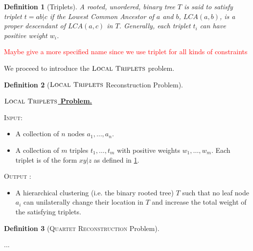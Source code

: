 \documentclass{article}
\theoremstyle{definition}  %
\theoremstyle{plain}
\newtheorem{definition}{Definition}
\numberwithin{observation}{section}
\numberwithin{claim}{section}
\numberwithin{fact}{section}
\numberwithin{lemma}{section}
\numberwithin{proposition}{section}
\numberwithin{theorem}{section}
\numberwithin{corollary}{section}
\numberwithin{definition}{section}
\newenvironment{nproblem}[1][\unskip]{%
  \medskip
  \begin{mdframed}
  \noindent
  \textbf{\underline{$#1$ Problem.}} \\
  \noindent
}{%
  \end{mdframed}
  \medskip %
}
\newcommand{\Triplets}{\textsc{Local Triplets}}
\theoremstyle{plain}
\begin{document}
\begin{definition}[Triplets] \label{def:triplets}
    A rooted, unordered, binary tree $T$ is said to satisfy triplet $t = ab|c$ if the Lowest Common Ancestor of $a$ and $b$, $LCA(a, b)$, is a proper descendant of $LCA(a, c)$ in $T$. Generally, each triplet $t_i$ can have positive weight $w_i$.
\end{definition}
\textcolor{red}{Maybe give a more specified name since we use triplet for all kinds of constraints}

We proceed to introduce the $\Triplets$ problem.

\begin{definition}[\textsc{$\Triplets$} Reconstruction Problem] \label{def:triplet_problem}
\end{definition}

\begin{nproblem}[\Triplets]
 \textsc{Input:}  
 \begin{itemize}
    \vspace{-0.1in}
   \item A collection of $n$ nodes $a_1,\dots,a_n$.
   \item A collection of $m$ triples $t_1,\dots, t_{m}$ with positive weights $w_1,\dots, w_{m}$. Each triplet is of the form $xy|z$ as defined in \cref{def:triplets}.
\end{itemize}
\vspace{-0.1in}
  \noindent \textsc{Output :} \begin{itemize}[label = ]
      \vspace{-0.1in}
      \item A hierarchical clustering (i.e. the binary rooted tree) $T$ such that no leaf node $a_i$ can unilaterally change their location in $T$ and increase  the total weight of the satisfying triplets.
      \end{itemize}
\end{nproblem}


\begin{definition}[\textsc{Quartet Reconstruction} Problem]
\end{definition}

 
...
\end{document}
